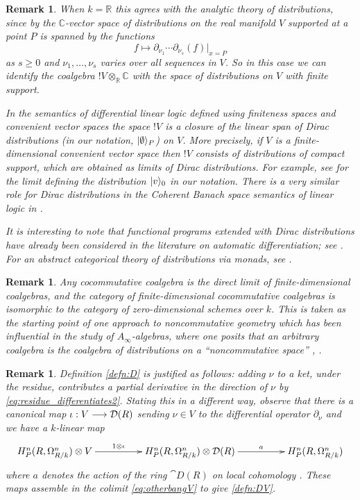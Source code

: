 \documentclass[english,letter paper,12pt,reqno]{article}
\DeclarePairedDelimiter\ket{\lvert}{\rangle}
\theoremstyle{example}
\newtheorem{remark}[theorem]{Remark}
\def\be{\begin{equation}}
\def\ee{\end{equation}}
\begin{document}
\begin{remark}\label{remark:distr} When $k = \mathbb{R}$ this agrees with the analytic theory of distributions, since by \cite[Theorem 3.2.1]{friedlander} the $\mathbb{C}$-vector space of distributions on the real manifold $V$ supported at a point $P$ is spanned by the functions
\[
f \longmapsto \partial_{\nu_1} \cdots \partial_{\nu_s}(f)|_{x=P}
\]
as $s \ge 0$ and $\nu_1,\ldots,\nu_s$ varies over all sequences in $V$. So in this case we can identify the coalgebra ${!} V \otimes_{\mathbb{R}} \mathbb{C}$ with the space of distributions on $V$ with finite support.

In the semantics of differential linear logic defined using finiteness spaces \cite{ehrhard-finiteness} and convenient vector spaces \cite{blutecon} the space ${!} V$ is a closure of the linear span of Dirac distributions (in our notation, $\ket{\emptyset}_P$) on $V$. More precisely, if $V$ is a finite-dimensional convenient vector space then ${!} V$ consists of distributions of compact support, which are obtained as limits of Dirac distributions. For example, see \cite[Theorem 5.7]{blutecs} for the limit defining the distribution $\ket{v}_0$ in our notation. There is a very similar role for Dirac distributions in the Coherent Banach space semantics of linear logic in \cite[\S 3.2]{girard_banach}. 

It is interesting to note that functional programs extended with Dirac distributions have already been considered in the literature on automatic differentiation; see \cite{nilsson}. For an abstract categorical theory of distributions via monads, see \cite{kock}.
\end{remark}

\begin{remark}
Any cocommutative coalgebra is the direct limit of finite-dimensional coalgebras, and the category of finite-dimensional cocommutative coalgebras is isomorphic to the category of zero-dimensional schemes over $k$. This is taken as the starting point of one approach to noncommutative geometry which has been influential in the study of $A_\infty$-algebras, where one posits that an arbitrary coalgebra is the coalgebra of distributions on a ``noncommutative space'' \cite[p.15]{kontnc}, \cite{kontnc2, lebruyn}.
\end{remark}

\begin{remark}\label{remark:justify}
Definition \ref{defn:D} is justified as follows: adding $\nu$ to a ket, under the residue, contributes a partial derivative in the direction of $\nu$ by \eqref{eq:residue_differentiates2}. Stating this in a different way, observe that there is a canonical map $\iota: V \longrightarrow \mathcal{D}(R)$ sending $\nu \in V$ to the differential operator $\partial_\nu$ and we have a $k$-linear map
\be
\xymatrix@C+2pc{
H^n_P(R, \Omega^n_{R/k}) \otimes V \ar[r]^-{1 \otimes \iota} & H^n_P(R, \Omega^n_{R/k}) \otimes \cat{D}(R) \ar[r]^-{a} & H^n_P(R, \Omega^n_{R/k})
}
\ee
where $a$ denotes the action of the ring $\cat{D}(R)$ on local cohomology \cite[Lemma 2.7]{murfet_coalg}. These maps assemble in the colimit \eqref{eq:otherbangV} to give \eqref{defn:DV}.
\end{remark}


\providecommand{\bysame}{\leavevmode\hbox to3em{\hrulefill}\thinspace}
\providecommand{\href}[2]{#2}
\end{document}

